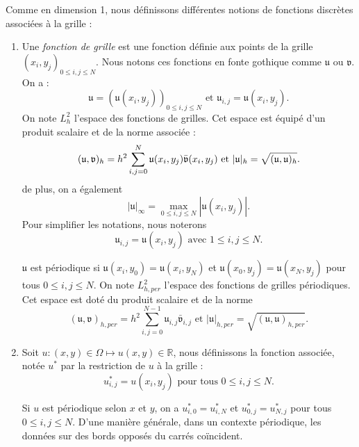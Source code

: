 Comme en dimension 1, nous définissons différentes notions de fonctions discrètes associées à la grille :
\begin{enumerate}
\item Une \textit{fonction de grille} est une fonction définie aux points de la grille $(x_i,y_j)_{0 \leq i,j \leq N}$. Nous notons ces fonctions en fonte gothique comme $\mathfrak{u}$ ou $\mathfrak{v}$. On a :
\begin{equation}
\mathfrak{u} = \left( \mathfrak{u}(x_i,y_j) \right)_{0 \leq i,j \leq N} \text{ et } \mathfrak{u}_{i,j} = \mathfrak{u}(x_i,y_j).
\end{equation}
On note $L^2_h$ l'espace des fonctions de grilles. Cet espace est équipé d'un produit scalaire et de la norme associée :
\begin{equation}
(\mathfrak{u}, \mathfrak{v})_h = h^2 \displaystyle\sum\limits_{i,j=0}^N \mathfrak{u}(x_i, y_j) \bar{\mathfrak{v}}(x_i, y_j) \text{ et } |\mathfrak{u}|_h = \sqrt{(\mathfrak{u},\mathfrak{u})_h}.
\end{equation}
de plus, on a également
\begin{equation}
| \mathfrak{u} |_{\infty} = \max_{0 \leq i,j \leq N} |\mathfrak{u}(x_i, y_j)|.
\end{equation}
Pour simplifier les notations, nous noterons
\begin{equation}
\mathfrak{u}_{i,j} = \mathfrak{u}(x_i, y_j) \text{ avec } 1 \leq i,j \leq N.
\end{equation}

$\mathfrak{u}$ est périodique si $\mathfrak{u}(x_{i},y_0) = \mathfrak{u}(x_{i},y_N)$ et $\mathfrak{u}(x_{0},y_j) = \mathfrak{u}(x_{N},y_j)$ pour tous $0 \leq i,j \leq N$. On note $L_{h,per}^2$ l'espace des fonctions de grilles périodiques. Cet espace est doté du produit scalaire et de la norme
\begin{equation}
(\mathfrak{u},\mathfrak{v})_{h,per} = h^2 \sum_{i,j=0}^{N-1} \mathfrak{u}_{i,j} \bar{\mathfrak{v}}_{i,j} \text{ et } |\mathfrak{u}|_{h,per} = \sqrt{(\mathfrak{u}, \mathfrak{u})_{h,per}}.
\end{equation}


\item Soit $u : (x,y) \in \Omega \mapsto u(x,y) \in \mathbb{R}$, nous définissons la fonction associée, notée $u^*$ par la restriction de $u$ à la grille :
\begin{equation}
u^*_{i,j} = u(x_i, y_j) \text{ pour tous } 0 \leq i,j \leq N.
\end{equation}

Si $u$ est périodique selon $x$ et $y$, on a $u^*_{i,0}=u^*_{i,N}$ et $u^*_{0,j}=u^*_{N,j}$ pour tous $0 \leq i,j \leq N$.
D'une manière générale, dans un contexte périodique, les données sur des bords opposés du carrés coïncident.






\end{enumerate}
